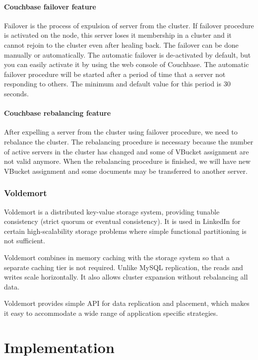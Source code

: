 \documentclass[a4paper]{article}
\begin{document}
\paragraph{Couchbase failover feature}
Failover is the process of expulsion of server from the cluster. 
If failover procedure is activated on the node, this server loses it membership in a cluster and it cannot rejoin to the cluster even after healing back. 
The failover can be done manually or automatically. 
The automatic failover is de-activated by default, but you can easily activate it by using the web console of Couchbase. 
The automatic failover procedure will be started after a period of time that a server not responding to others.
The minimum and default value for this period is 30 seconds. 

\paragraph{Couchbase rebalancing feature}
After expelling a server from the cluster using failover procedure, we need to rebalance the cluster. 
The rebalancing procedure is necessary because the number of active servers in the cluster has changed and some of VBucket assignment are not valid anymore.
When the rebalancing procedure is finished, we will have new VBucket assignment and some documents may be transferred to another server.


\subsubsection{Voldemort}

Voldemort is a distributed key-value storage system, providing tunable consistency (strict quorum or eventual consistency). It is used in LinkedIn for certain 
high-scalability storage problems where simple functional partitioning is not sufficient. 

Voldemort combines in memory caching with the storage system so that a separate caching tier is not required. Unlike MySQL replication, the reads and writes scale horizontally. It also allows cluster expansion without rebalancing all data.

Voldemort provides simple API for data replication and placement, which makes it easy to accommodate a wide range of application specific strategies.


\section{Implementation}
\end{document}
